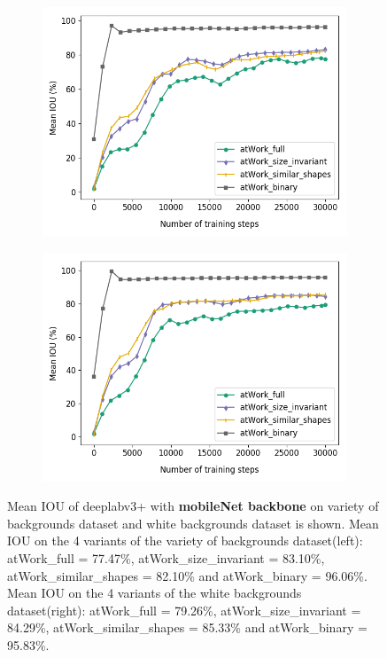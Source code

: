 	\begin{figure}[!htb]
		\begin{subfigure}{.5\textwidth}
			\centering
			\includegraphics[width=1\linewidth]{images/mobi_4vars}
		\end{subfigure}
		\begin{subfigure}{.5\textwidth}
			\centering
			\includegraphics[width=1\linewidth]{images/mobi_4vars_white}
		\end{subfigure}
		\caption{Mean IOU of deeplabv3+ with \textbf{mobileNet backbone} on variety of backgrounds dataset and white backgrounds dataset is shown. Mean IOU on the 4 variants of the variety of backgrounds dataset(left): atWork\_full = 77.47\%, atWork\_size\_invariant = 83.10\%, atWork\_similar\_shapes = 82.10\% and atWork\_binary = 96.06\%. Mean IOU on the 4 variants of the white backgrounds dataset(right): atWork\_full = 79.26\%, atWork\_size\_invariant = 84.29\%, atWork\_similar\_shapes = 85.33\% and atWork\_binary = 95.83\%.}
		\label{Fig:mobivars}
	\end{figure}
	
